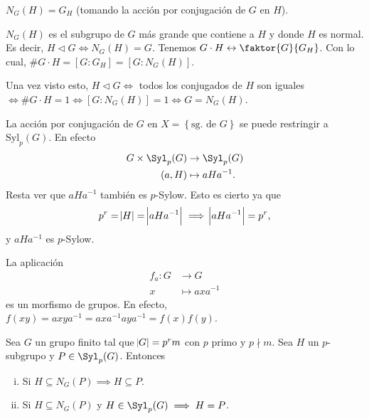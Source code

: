 \begin{obs}
    $N_G(H) = G_H$ (tomando la acción por conjugación de $G$ en $H$).
\end{obs}
\begin{obs}
    $N_G(H)$ es el subgrupo de $G$ más grande que contiene a $H$ y donde $H$ es normal. Es decir,
    $H \triangleleft G \iff N_G(H) = G$.
    Tenemos  $G \cdot H \leftrightarrow \faktor{G}{G_H}$. Con lo cual, $\# G \cdot H = \left[ G : G_H \right]
    = \left[ G : N_G(H) \right]$.

    Una vez visto esto, $H \triangleleft G \iff$ todos los conjugados de $H$ son iguales $\iff \# G \cdot H = 1
    \iff \left[ G : N_G(H) \right] = 1 \iff G = N _G(H)$.
\end{obs}

\begin{obs}
    La acción por conjugación de $G$ en $X = \left\{ \text{sg. de } G \right\}$ se puede restringir a
    $\text{Syl}_p(G)$. En efecto
    \[
        \begin{aligned}
            G \times \Syl_p(G) &\to \Syl_p(G) \\
            (a, H) &\mapsto aHa^{-1}.
        \end{aligned}
    \]
    Resta ver que $aHa^{-1}$ tambi\'{e}n es $p$-Sylow. Esto es cierto ya que
    \[
        p^r = \abs{H} = \abs{aHa^{-1}} \implies \abs{aHa^{-1}} = p^r,
    \]
    y $aHa^{-1}$ es $p$-Sylow.
\end{obs}

\begin{obs}
    La aplicación
    \[
        \begin{aligned}
            f_a \colon G &\to G \\
            x &\mapsto axa^{-1}
        \end{aligned}
    \]
    es un morfismo de grupos. En efecto, $f(xy) = axya^{-1} = axa^{-1}aya^{-1} = f(x)f(y)$.
\end{obs}

\begin{lema}\label{lema:stsyla}
    Sea $G$ un grupo finito tal que $\abs{G} = p^rm$ con $p$ primo y $p \nmid m$. Sea $H$ un $p$-subgrupo y
    $P \in \Syl_p(G)$. Entonces
    \begin{enumerate}[i)]
        \item Si $H \subseteq N_G(P) \implies H \subseteq P$.
        \item Si $H \subseteq N_G(P)$ y $H \in \Syl_p(G) \implies H = P$.
    \end{enumerate}
\end{lema}

